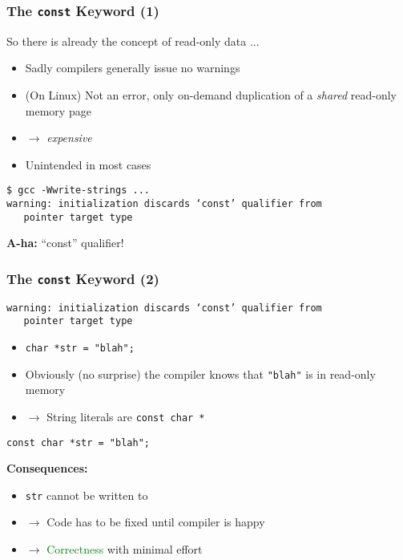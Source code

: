 \begin{frame}[fragile]
  \frametitle{The \texttt{const} Keyword (1)}

  So there is already the concept of read-only data ...

  \begin{itemize}
  \item Sadly compilers generally issue no warnings
  \item (On Linux) Not an error, only on-demand duplication of a
    \textit{shared} read-only memory page
  \item $\to$ \textit{expensive}
  \item Unintended in most cases
  \end{itemize}

  \begin{block}{}
\begin{verbatim}
$ gcc -Wwrite-strings ...
warning: initialization discards ‘const’ qualifier from 
   pointer target type
\end{verbatim}
  \end{block}

  \textbf{A-ha:} ``const'' qualifier!

\end{frame}

\begin{frame}[fragile]
  \frametitle{The \texttt{const} Keyword (2)}

  \begin{block}{}
\begin{verbatim}
warning: initialization discards ‘const’ qualifier from 
   pointer target type
\end{verbatim}
  \end{block}

  \begin{itemize}
  \item \texttt{char *str = "blah";}
  \item Obviously (no surprise) the compiler knows that
    \texttt{"blah"} is in read-only memory
  \item $\to$ String literals are \texttt{const char *}
  \end{itemize}

  \begin{block}{}
\begin{verbatim}
const char *str = "blah";
\end{verbatim}
  \end{block}

  \textbf{Consequences:}

  \begin{itemize}
  \item \texttt{str} cannot be written to
  \item $\to$ Code has to be fixed until compiler is happy
  \item $\to$ \textcolor{green}{Correctness} with minimal effort
  \end{itemize}

\end{frame}

